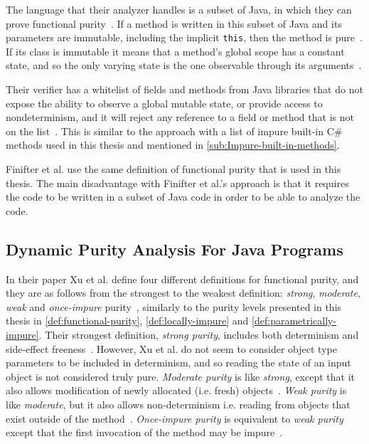 \documentclass[a4paper,12pt]{article}
\begin{document}
The language that their analyzer handles is a subset of Java, in which they can prove functional purity~\cite{purity-in-java}. If a method is written in this subset of Java and its parameters are immutable, including the implicit \texttt{this}, then the method is pure~\cite{purity-in-java}. %
If its class is immutable it means that a method's global scope has a constant state, and so the only varying state is the one observable through its arguments~\cite{purity-in-java}.

Their verifier has a whitelist of fields and methods from Java libraries that do not expose the ability to observe a global mutable state, or provide access to nondeterminism, and it will reject any reference to a field or method that is not on the list~\cite{purity-in-java}. This is similar to the approach with a list of impure built-in C\# methods used in this thesis and mentioned in \autoref{sub:Impure-built-in-methods}.

Finifter et al. use the same definition of functional purity that is used in this thesis. The main disadvantage with Finifter et al.'s approach is that it requires the code to be written in a subset of Java code in order to be able to analyze the code.

\subsection{Dynamic Purity Analysis For Java Programs} \label{sub:Dynamic Purity Analysis For Java Programs}

In their paper Xu et al. define four different definitions for functional purity, and they are as follows from the strongest to the weakest definition: \textit{strong}, \textit{moderate}, \textit{weak} and \textit{once-impure} purity~\cite{xu2007dynamic}, similarly to the purity levels presented in this thesis in \autoref{def:functional-purity}, \autoref{def:locally-impure} and \autoref{def:parametrically-impure}. Their strongest definition, \textit{strong purity}, includes both determinism and side-effect freeness~\cite{xu2007dynamic}. However, Xu et al. do not seem to consider object type parameters to be included in determinism, and so reading the state of an input object is not considered truly pure. \textit{Moderate purity} is like \textit{strong}, except that it also allows modification of newly allocated (i.e. fresh) objects~\cite{xu2007dynamic}. \textit{Weak purity} is like \textit{moderate}, but it also allows non-determinism i.e. reading from objects that exist outside of the method~\cite{xu2007dynamic}. \textit{Once-impure purity} is equivalent to \textit{weak purity} except that the first invocation of the method may be impure~\cite{xu2007dynamic}.
\end{document}
